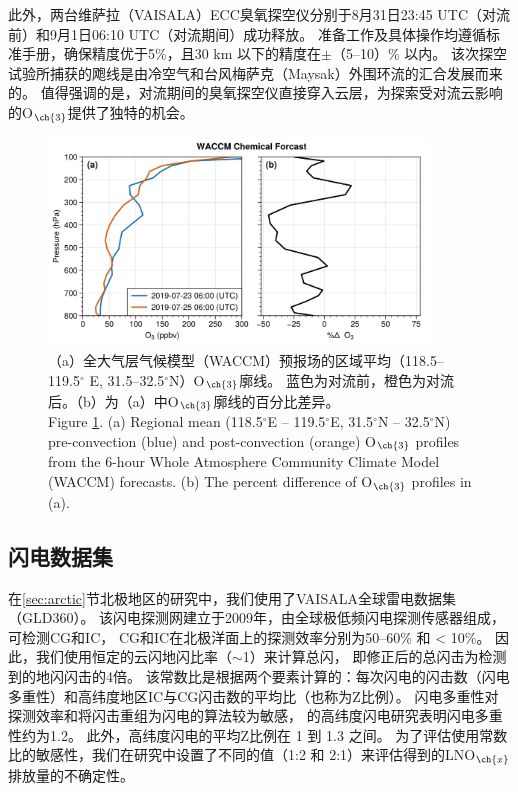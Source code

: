 此外，两台维萨拉（VAISALA）ECC臭氧探空仪分别于8月31日23:45 UTC（对流前）和9月1日06:10 UTC（对流期间）成功释放。
准备工作及具体操作均遵循标准手册，确保精度优于5\%，且30 km 以下的精度在$\pm$（5--10）\% 以内\citep{Smit.2007}。
该次探空试验所捕获的飑线是由冷空气和台风梅萨克（Maysak）外围环流的汇合发展而来的。
值得强调的是，对流期间的臭氧探空仪直接穿入云层，为探索受对流云影响的O$_{\ch{3}}$提供了独特的机会。

\begin{figure}[H]
\centering
\includegraphics[width=0.9\textwidth]{./figures/waccm_forcast_o3.png}
\caption{（a）全大气层气候模型（WACCM）预报场的区域平均（118.5--119.5$^{\circ}$ E, 31.5--32.5$^{\circ}$N）O$_{\ch{3}}$廓线。
蓝色为对流前，橙色为对流后。（b）为（a）中O$_{\ch{3}}$廓线的百分比差异。\\
Figure \ref{fig:waccm_forcast_o3}. (a) Regional mean (118.5$^{\circ}$E – 119.5$^{\circ}$E, 31.5$^{\circ}$N – 32.5$^{\circ}$N)
pre-convection (blue) and post-convection (orange) O$_{\ch{3}}$ profiles from the 6-hour Whole Atmosphere Community Climate Model (WACCM) forecasts.
(b) The percent difference of O$_{\ch{3}}$ profiles in (a).
}
\label{fig:waccm_forcast_o3}
\end{figure}

\subsection{闪电数据集}

在\ref{sec:arctic}节北极地区的研究中，我们使用了VAISALA全球雷电数据集（GLD360）。
该闪电探测网建立于2009年，由全球极低频闪电探测传感器组成，可检测CG和IC\citep{Said.2010,Said.2013,Said.2017}，
CG和IC在北极洋面上的探测效率分别为50--60\% 和 < 10\%\citep{Vagasky.2022}。
因此，我们使用恒定的云闪地闪比率（$\sim$1）来计算总闪，
即修正后的总闪击为检测到的地闪闪击的4倍\citep{Mackerras.1994,Prentice.1977}。
该常数比是根据两个要素计算的：每次闪电的闪击数（闪电多重性）和高纬度地区IC与CG闪击数的平均比（也称为Z比例）。
闪电多重性对探测效率和将闪击重组为闪电的算法较为敏感\citep{Schulz.2005,Yair.2014,Burgesser.2017,Kolmasova.2022}，
\citet{Yusop.2019}的高纬度闪电研究表明闪电多重性约为1.2。
此外，高纬度闪电的平均Z比例在 1 到 1.3 之间\citep{Mackerras.1994,Prentice.1977,Bandholnopparat.2020}。
为了评估使用常数比的敏感性，我们在研究中设置了不同的值（1:2 和 2:1）来评估得到的LNO$_{\ch{x}}$排放量的不确定性。


